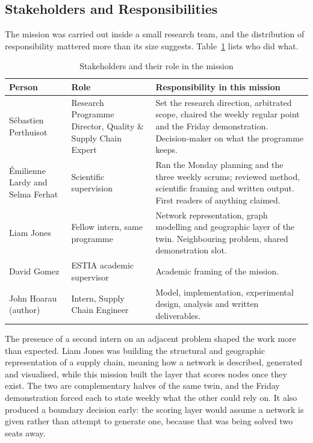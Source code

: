 
\subsection{Stakeholders and Responsibilities}
\label{sec:parties_prenantes}

The mission was carried out inside a small research team, and the distribution of
responsibility mattered more than its size suggests. Table~\ref{tab:parties} lists who did
what.

\begin{table}[htbp]
\centering
\caption{Stakeholders and their role in the mission}
\label{tab:parties}
\small
\begin{tabularx}{\linewidth}{>{\raggedright\arraybackslash}p{3.7cm} >{\raggedright\arraybackslash}p{3.6cm} X}
\toprule
\textbf{Person} & \textbf{Role} & \textbf{Responsibility in this mission} \\
\midrule
S\'ebastien Perthuisot & Research Programme Director, Quality \& Supply Chain Expert &
Set the research direction, arbitrated scope, chaired the weekly regular point and the
Friday demonstration. Decision-maker on what the programme keeps. \\
\'Emilienne Lardy \newline and Selma Ferhat & Scientific supervision & Ran the Monday
planning and the three weekly scrums; reviewed method, scientific framing and written
output. First readers of anything claimed. \\
Liam Jones & Fellow intern, same programme & Network representation, graph modelling and
geographic layer of the twin. Neighbouring problem, shared demonstration slot. \\
David Gomez & ESTIA academic supervisor & Academic framing of the mission. \\
John Hoarau \newline (author) & Intern, Supply Chain Engineer & Model, implementation, experimental design,
analysis and written deliverables. \\
\bottomrule
\end{tabularx}
\end{table}

The presence of a second intern on an adjacent problem shaped the work more than expected.
Liam Jones was building the structural and geographic representation of a supply chain,
meaning how a network is described, generated and visualised, while this mission built the
layer that scores nodes once they exist. The two are complementary halves of the same twin,
and the Friday demonstration forced each to state weekly what the other could rely on. It
also produced a boundary decision early: the scoring layer would assume a network is given
rather than attempt to generate one, because that was being solved two seats away.

